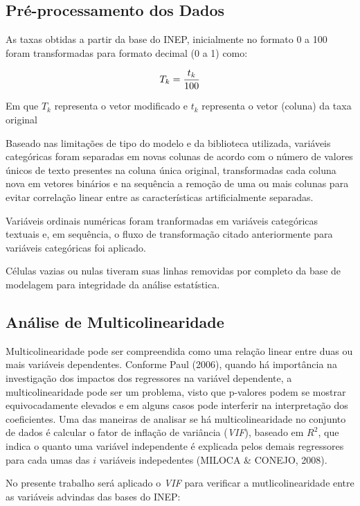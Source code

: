 \documentclass[english, spanish, brazilian]{RBIEarticle} %
\begin{document}
\subsection{Pré-processamento dos Dados}
As taxas obtidas a partir da base do INEP, inicialmente no formato 0 a 100 foram transformadas para formato decimal (0 a 1) como:

\vspace{0.5cm}
\begin{equation}
\large T_k = \frac{t_k}{100}
\end{equation}
\vspace{0.5cm}

Em que $T_k$ representa o vetor modificado e $t_k$ representa o vetor (coluna) da taxa original

Baseado nas limitações de tipo do modelo e da biblioteca utilizada, variáveis categóricas foram separadas em novas colunas de acordo com o número de valores únicos de texto presentes na coluna única original, transformadas cada coluna nova em vetores binários e na sequência a remoção de uma ou mais colunas para evitar correlação linear entre as características artificialmente separadas.  

Variáveis ordinais numéricas foram tranformadas em variáveis categóricas textuais e, em sequência, o fluxo de transformação citado anteriormente para variáveis categóricas foi aplicado.

Células vazias ou nulas tiveram suas linhas removidas por completo da base de modelagem para integridade da análise estatística.

\subsection{Análise de Multicolinearidade}
Multicolinearidade pode ser compreendida como uma relação linear entre duas ou mais variáveis dependentes. Conforme Paul (2006), quando há importância na investigação dos impactos dos regressores na variável dependente, a multicolinearidade pode ser um problema, visto que p-valores podem se mostrar equivocadamente elevados e em alguns casos pode interferir na interpretação dos coeficientes. Uma das maneiras de analisar se há multicolinearidade no conjunto de dados é calcular o fator de inflação de variância (\textit{VIF}), baseado em $R^2$, que indica o quanto uma variável independente é explicada pelos demais regressores para cada umas das $i$ variáveis indepedentes (MILOCA \& CONEJO, 2008).

No presente trabalho será aplicado o \textit{VIF} para verificar a mutlicolinearidade entre as variáveis advindas das bases do INEP:
\end{document}
